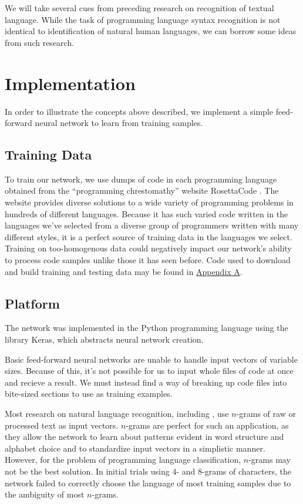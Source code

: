 \documentclass{article}
\begin{document}
We will take several cues from preceding research on recognition of textual language. While the task of programming language syntax recognition is not identical to identification of natural human languages, we can borrow some ideas from such research.

\section{Implementation}
In order to illustrate the concepts above described, we implement a simple feed-forward neural network to learn from training samples.

\subsection{Training Data}
To train our network, we use dumps of code in each programming language obtained from the ``programming chrestomathy'' website RosettaCode \cite{rosettacode}. The website provides diverse solutions to a wide variety of programming problems in hundreds of different languages. Because it has such varied code written in the languages we've selected from a diverse group of programmers written with many different styles, it is a perfect source of training data in the languages we select. Training on too-homogenous data could negatively impact our network's ability to process code samples unlike those it has seen before. Code used to download and build training and testing data may be found in  \hyperref[sec:appendix_a]{Appendix A}.
\subsection{Platform}
The network was implemented in the Python programming language using the library Keras, which abstracts neural network creation.

Basic feed-forward neural networks are unable to handle input vectors of variable sizes. Because of this, it's not possible for us to input whole files of code at once and recieve a result. We must instead find a way of breaking up code files into bite-sized sections to use as training examples.

Most research on natural language recognition, including \cite{langidstanford}, use $n$-grams of raw or processed text as input vectors. $n$-grams are perfect for such an application, as they allow the network to learn about patterns evident in word structure and alphabet choice and to standardize input vectors in a simplistic manner. However, for the problem of programming language classification, $n$-grams may not be the best solution. In initial trials using $4$- and $8$-grams of characters, the network failed to correctly choose the language of most training samples due to the ambiguity of most $n$-grams.
\end{document}
